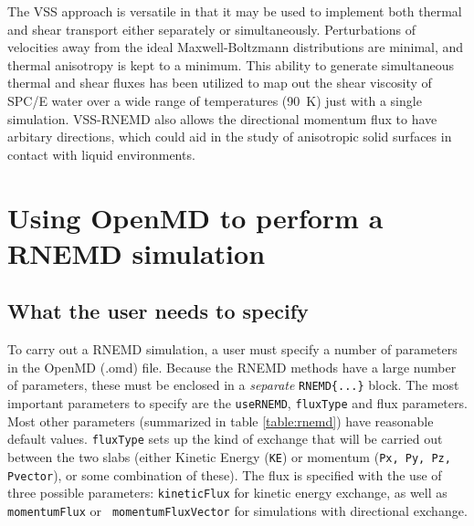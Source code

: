 \documentclass[]{book}
\begin{document}
The VSS approach is versatile in that it may be used to implement both
thermal and shear transport either separately or simultaneously.
Perturbations of velocities away from the ideal Maxwell-Boltzmann
distributions are minimal, and thermal anisotropy is kept to a
minimum.  This ability to generate simultaneous thermal and shear
fluxes has been utilized to map out the shear viscosity of SPC/E water
over a wide range of temperatures (90~K) just with a single simulation.
VSS-RNEMD also allows the directional momentum flux to have
arbitary directions, which could aid in the study of anisotropic solid
surfaces in contact with liquid environments.

\section{\label{section:usingRNEMD}Using OpenMD to perform a RNEMD simulation}
\subsection{\label{section:rnemdParams} What the user needs to specify}

To carry out a RNEMD simulation, a user must specify a number of
parameters in the OpenMD (.omd) file.  Because the RNEMD methods have
a large number of parameters, these must be enclosed in a {\it
  separate} {\tt RNEMD\{...\}} block.  The most important parameters
to specify are the {\tt useRNEMD}, {\tt fluxType} and flux
parameters. Most other parameters (summarized in table
\ref{table:rnemd}) have reasonable default values.  {\tt fluxType}
sets up the kind of exchange that will be carried out between the two
slabs (either Kinetic Energy ({\tt KE}) or momentum ({\tt Px, Py, Pz,
  Pvector}), or some combination of these).  The flux is specified
with the use of three possible parameters: {\tt kineticFlux} for
kinetic energy exchange, as well as {\tt momentumFlux} or {\tt
  momentumFluxVector} for simulations with directional exchange.
\end{document}
